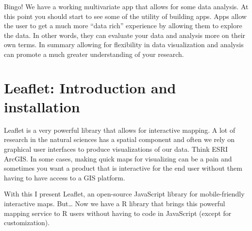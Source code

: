 \documentclass[]{article}
\newenvironment{Shaded}{\begin{snugshade}}{\end{snugshade}}
\newcommand{\CommentTok}[1]{\textcolor[rgb]{0.56,0.35,0.01}{\textit{#1}}}
\newcommand{\DataTypeTok}[1]{\textcolor[rgb]{0.13,0.29,0.53}{#1}}
\newcommand{\DecValTok}[1]{\textcolor[rgb]{0.00,0.00,0.81}{#1}}
\newcommand{\KeywordTok}[1]{\textcolor[rgb]{0.13,0.29,0.53}{\textbf{#1}}}
\newcommand{\NormalTok}[1]{#1}
\newcommand{\OperatorTok}[1]{\textcolor[rgb]{0.81,0.36,0.00}{\textbf{#1}}}
\newcommand{\StringTok}[1]{\textcolor[rgb]{0.31,0.60,0.02}{#1}}
\begin{document}
\begin{Shaded}
\end{Shaded}

Bingo! We have a working multivariate app that allows for some data
analysis. At this point you should start to see some of the utility of
building apps. Apps allow the user to get a much more ``data rich''
experience by allowing them to explore the data. In other words, they
can evaluate your data and analysis more on their own terms. In summary
allowing for flexibility in data visualization and analysis can promote
a much greater understanding of your research.

\hypertarget{leaflet-introduction-and-installation}{%
\section{Leaflet: Introduction and
installation}\label{leaflet-introduction-and-installation}}

Leaflet is a very powerful library that allows for interactive mapping.
A lot of research in the natural sciences has a spatial component and
often we rely on graphical user interfaces to produce visualizations of
our data. Think ESRI ArcGIS. In some cases, making quick maps for
visualizing can be a pain and sometimes you want a product that is
interactive for the end user without them having to have access to a GIS
platform.

With this I present Leaflet, an open-source JavaScript library for
mobile-friendly interactive maps. But\ldots{} Now we have a R library
that brings this powerful mapping service to R users without having to
code in JavaScript (except for customization).
\end{document}
